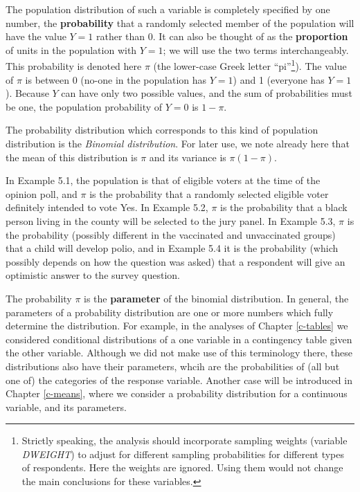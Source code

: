\documentclass[11pt,a4paper,openany]{book}
\let\rmarkdownfootnote\footnote%
\def\footnote{\protect\rmarkdownfootnote}
\begin{document}
The population distribution of such a variable is completely specified
by one number, the \textbf{probability} that a randomly selected member
of the population will have the value \(Y=1\) rather than 0. It can also
be thought of as the \textbf{proportion} of units in the population with
\(Y=1\); we will use the two terms interchangeably. This probability is
denoted here \(\pi\) (the lower-case Greek letter ``pi''\footnote{Strictly
  speaking, the analysis should incorporate sampling weights (variable
  \emph{DWEIGHT}) to adjust for different sampling probabilities for
  different types of respondents. Here the weights are ignored. Using
  them would not change the main conclusions for these variables.}). The
value of \(\pi\) is between 0 (no-one in the population has \(Y=1\)) and
1 (everyone has \(Y=1\)). Because \(Y\) can have only two possible
values, and the sum of probabilities must be one, the population
probability of \(Y=0\) is \(1-\pi\).

\label{Binomial} The probability distribution which corresponds to this
kind of population distribution is the \emph{Binomial distribution}. For
later use, we note already here that the mean of this distribution is
\(\pi\) and its variance is \(\pi(1-\pi)\).

In Example 5.1, the population is that of eligible voters at the time of
the opinion poll, and \(\pi\) is the probability that a randomly
selected eligible voter definitely intended to vote Yes. In Example 5.2,
\(\pi\) is the probability that a black person living in the county will
be selected to the jury panel. In Example 5.3, \(\pi\) is the
probability (possibly different in the vaccinated and unvaccinated
groups) that a child will develop polio, and in Example 5.4 it is the
probability (which possibly depends on how the question was asked) that
a respondent will give an optimistic answer to the survey question.

The probability \(\pi\) is the \textbf{parameter} of the binomial
distribution. In general, the parameters of a probability distribution
are one or more numbers which fully determine the distribution. For
example, in the analyses of Chapter \ref{c-tables} we considered
conditional distributions of a one variable in a contingency table given
the other variable. Although we did not make use of this terminology
there, these distributions also have their parameters, whcih are the
probabilities of (all but one of) the categories of the response
variable. Another case will be introduced in Chapter \ref{c-means},
where we consider a probability distribution for a continuous variable,
and its parameters.
\end{document}
